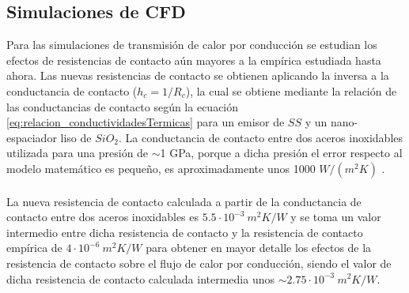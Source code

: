 \subsection{Simulaciones de CFD}
Para las simulaciones de transmisión de calor por conducción se estudian los efectos de resistencias de contacto aún mayores a la empírica estudiada hasta ahora. Las nuevas resistencias de contacto se obtienen aplicando la inversa a la conductancia de contacto ($h_c=1/R_c$), la cual se obtiene mediante la relación de las conductancias de contacto según la ecuación \eqref{eq:relacion_conductividadesTermicas} para un emisor de $SS$ y un nano-espaciador liso de $SiO_2$. La conductancia de contacto entre dos aceros inoxidables utilizada para una presión de $\sim$1 GPa, porque a dicha presión el error respecto al modelo matemático es pequeño, es aproximadamente unos 1000 $W/(m^2 K)$ \cite{experimental_Rc_SS}.\\\\
La nueva resistencia de contacto calculada a partir de la conductancia de contacto entre dos aceros inoxidables es $5.5\cdot 10^{-3} \ m^2 K/W$ y se toma un valor intermedio entre dicha resistencia de contacto y la resistencia de contacto empírica de $4\cdot 10^{-6} \ m^2 K/W$ \cite{nf_TPV_Pillars_SiO2} para obtener en mayor detalle los efectos de la resistencia de contacto sobre el flujo de calor por conducción, siendo el valor de dicha resistencia de contacto calculada intermedia unos $\sim 2.75\cdot 10^{-3} \ m^2 K/W$.
\graphicspath{ {./figuras/Resultados/conduccion/pdf/} }
